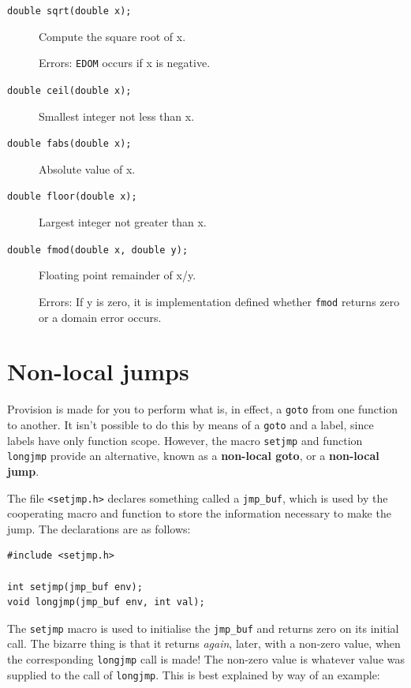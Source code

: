 \begin{description}
   \item[\texttt{double sqrt(double x);}] Compute the square root of x.

    Errors: \texttt{EDOM} occurs if x is negative.

   \item[\texttt{double ceil(double x);}] Smallest integer not less than x.

   \item[\texttt{double fabs(double x);}] Absolute value of x.

   \item[\texttt{double floor(double x);}] Largest integer not greater than x.

   \item[\texttt{double fmod(double x, double y);}] Floating point remainder of x/y.

    Errors: If y is zero, it is implementation defined
    whether \texttt{fmod} returns zero or a domain error occurs.
  \end{description}

 
        \section{Non-local jumps}
        

  

  Provision is made for you to perform what is, in effect,
   a \texttt{goto} from one function to another.  It isn't possible to do
   this by means of a \texttt{goto} and a label, since labels have only
   function scope.  However, the macro \texttt{setjmp} and function
   \texttt{longjmp} provide an alternative, known as a \textbf{non-local
   goto}, or a \textbf{non-local jump}.


  The file \texttt{<setjmp.h>} declares something called
   a \texttt{jmp\_buf}, which is used by the cooperating macro and function
   to store the information necessary to make the jump.  The declarations are
   as follows:


  \begin{Verbatim}
#include <setjmp.h>

int setjmp(jmp_buf env);
void longjmp(jmp_buf env, int val);
\end{Verbatim}

  The \texttt{setjmp} macro is  used  to  initialise  the
   \texttt{jmp\_buf}  and returns zero on its initial call.  The bizarre
   thing is that it returns \textit{again}, later, with a  non-zero  value,
   when  the corresponding  \texttt{longjmp}  call is made!  The non-zero
   value is whatever value was supplied to the call of \texttt{longjmp}.
   This is best explained by way of an example:


